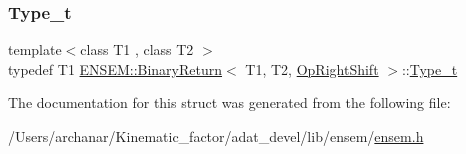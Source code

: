 \mbox{\label{structENSEM_1_1BinaryReturn_3_01T1_00_01T2_00_01OpRightShift_01_4_a5376360119f221e4df1236c273764f02}} 
\subsubsection{\texorpdfstring{Type\_t}{Type\_t}\hspace{0.1cm}{\footnotesize\ttfamily [2/2]}}
{\footnotesize\ttfamily template$<$class T1 , class T2 $>$ \\
typedef T1 \mbox{\hyperlink{structENSEM_1_1BinaryReturn}{E\+N\+S\+E\+M\+::\+Binary\+Return}}$<$ T1, T2, \mbox{\hyperlink{structENSEM_1_1OpRightShift}{Op\+Right\+Shift}} $>$\+::\mbox{\hyperlink{structENSEM_1_1BinaryReturn_3_01T1_00_01T2_00_01OpRightShift_01_4_a5376360119f221e4df1236c273764f02}{Type\+\_\+t}}}



The documentation for this struct was generated from the following file\+:\begin{DoxyCompactItemize}
\item 
/\+Users/archanar/\+Kinematic\+\_\+factor/adat\+\_\+devel/lib/ensem/\mbox{\hyperlink{lib_2ensem_2ensem_8h}{ensem.\+h}}\end{DoxyCompactItemize}
